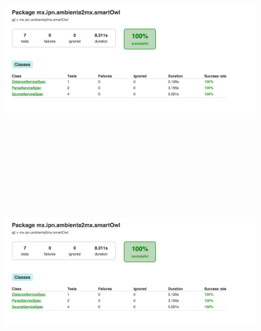     \begin{figure}[b!]
      \begin{center}
        \includegraphics[width=14cm,height=9cm]{./images/prueba1}
      \end{center}
    \end{figure}
    \begin{figure}[b!]
      \begin{center}
        \includegraphics[width=14cm,height=9cm]{./images/prueba1}
      \end{center}
    \end{figure}
